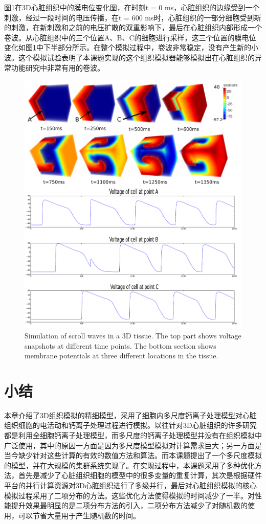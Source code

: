 图\ref{arrhythmia}在3D心脏组织中的膜电位变化图，在时刻t = 0 ms，心脏组织的边缘受到一个刺激，经过一段时间的电压传播，在t = 600 ms时，心脏组织的一部分细胞受到新的刺激，在新刺激和之前的电压扩散的双重影响下，最后在心脏组织内部形成一个卷波。从心脏组织中的三个位置A、B、C的细胞进行采样，这三个位置的膜电位变化如图\ref{arrhythmia}中下半部分所示。在整个模拟过程中，卷波非常稳定，没有产生新的小波。这个模拟试验表明了本课题实现的这个组织模拟器能够模拟出在心脏组织的异常功能研究中非常有用的卷波。

\begin{figure}[htbp]
\includegraphics[width=\textwidth]{figs/voltage}
\caption{Simulation of scroll waves in a 3D tissue. The top part shows voltage snapshots at different time points. The bottom section shows membrane potentials at three different locations in the tissue.}
\label{arrhythmia}
\end{figure}

\section{小结}
本章介绍了3D组织模拟的精细模型，采用了细胞内多尺度钙离子处理模型对心脏组织细胞的电活动和钙离子处理过程进行模拟。以往针对3D心脏组织的许多研究都是利用全细胞钙离子处理模型，而多尺度的钙离子处理模型并没有在组织模拟中广泛使用，其中的原因一方面是因为多尺度模型模拟对计算需求巨大；另一方面是当今缺少针对这些计算的有效的数值方法和算法。而本课题提出了一个多尺度模拟的模型，并在大规模的集群系统实现了。在实现过程中，本课题采用了多种优化方法，首先是减少了心脏组织细胞的模型中的很多变量的重复计算，其次是根据硬件平台的并行计算资源对3D心脏组织进行了多级并行，最后对心脏组织模拟的核心模拟过程采用了二项分布的方法。这些优化方法使得模拟的时间减少了一半。对性能提升效果最明显的是二项分布方法的引入，二项分布方法减少了对随机数的使用，可以节省大量用于产生随机数的时间。

